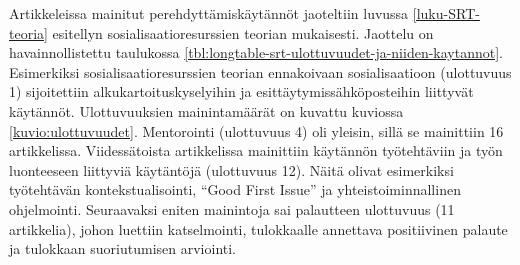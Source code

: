 \documentclass[utf8]{gradu3}
\begin{document}
Artikkeleissa mainitut perehdyttämiskäytännöt jaoteltiin luvussa \ref{luku-SRT-teoria} esitellyn sosialisaatioresurssien teorian mukaisesti. Jaottelu on havainnollistettu taulukossa \ref{tbl:longtable-srt-ulottuvuudet-ja-niiden-kaytannot}. Esimerkiksi sosialisaatioresurssien teorian ennakoivaan sosialisaatioon (ulottuvuus 1) sijoitettiin alkukartoituskyselyihin ja esittäytymissähköposteihin liittyvät käytännöt. Ulottuvuuksien mainintamäärät on kuvattu kuviossa \ref{kuvio:ulottuvuudet}. Mentorointi (ulottuvuus 4) oli yleisin, sillä se mainittiin 16 artikkelissa. Viidessätoista artikkelissa mainittiin käytännön työtehtäviin ja työn luonteeseen liittyviä käytäntöjä (ulottuvuus 12). Näitä olivat esimerkiksi työtehtävän kontekstualisointi, ``Good First Issue'' ja yhteistoiminnallinen ohjelmointi. Seuraavaksi eniten mainintoja sai palautteen ulottuvuus (11 artikkelia), johon luettiin katselmointi, tulokkaalle annettava positiivinen palaute ja tulokkaan suoriutumisen arviointi.
\end{document}
